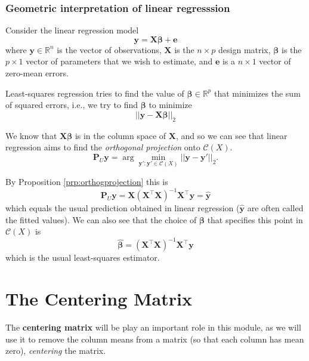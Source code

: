 \documentclass[]{book}
\theoremstyle{definition}
\theoremstyle{definition}
\theoremstyle{definition}
\theoremstyle{remark}
\begin{document}
\hypertarget{geometric-interpretation-of-linear-regresssion}{%
\subsubsection{Geometric interpretation of linear regresssion}\label{geometric-interpretation-of-linear-regresssion}}

Consider the linear regression model
\[\boldsymbol y= \boldsymbol X\boldsymbol \beta+\boldsymbol e\]
where \(\boldsymbol y\in\mathbb{R}^n\) is the vector of observations, \(\boldsymbol X\) is the \(n\times p\) design matrix, \(\boldsymbol \beta\) is the \(p\times 1\) vector of parameters that we wish to estimate, and \(\boldsymbol e\) is a \(n\times 1\) vector of zero-mean errors.

Least-squares regression tries to find the value of \(\boldsymbol \beta\in \mathbb{R}^p\) that minimizes the sum of squared errors, i.e., we try to find \(\boldsymbol \beta\) to minimize
\[||\boldsymbol y- \boldsymbol X\boldsymbol \beta||_2\]

We know that \(\boldsymbol X\boldsymbol \beta\) is in the column space of \(\boldsymbol X\), and so we can see that linear regression aims to find the \emph{orthogonal projection} onto \(\mathcal{C}(X)\).
\[\boldsymbol P_U\boldsymbol y=\arg \min_{\boldsymbol y': \boldsymbol y' \in \mathcal{C}(X)} ||\boldsymbol y-\boldsymbol y'||_2.\]

By Proposition \ref{prp:orthogprojection} this is
\[\boldsymbol P_U\boldsymbol y= \boldsymbol X(\boldsymbol X^\top \boldsymbol X)^{-1}\boldsymbol X^\top \boldsymbol y=\hat{\boldsymbol y}\]
which equals the usual prediction obtained in linear regression (\(\hat{\boldsymbol y}\) are often called the fitted values). We can also see that the choice of \(\boldsymbol \beta\) that specifies this point in \(\mathcal{C}(X)\) is
\[\hat{\boldsymbol \beta}=(\boldsymbol X^\top \boldsymbol X)^{-1}\boldsymbol X^\top \boldsymbol y\]
which is the usual least-squares estimator.

\hypertarget{centering-matrix}{%
\section{The Centering Matrix}\label{centering-matrix}}

The \textbf{centering matrix} will be play an important role in this module, as we will use it to remove the column means from a matrix (so that each column has mean zero), \emph{centering} the matrix.
\end{document}
